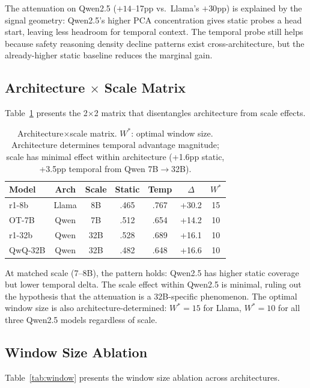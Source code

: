 \documentclass[11pt,a4paper]{article}
\begin{document}
The attenuation on Qwen2.5 ($+14$--17pp vs.\ Llama's $+30$pp) is explained by the signal geometry: Qwen2.5's higher PCA concentration gives static probes a head start, leaving less headroom for temporal context. The temporal probe still helps because safety reasoning density decline patterns exist cross-architecture, but the already-higher static baseline reduces the marginal gain.

\subsection{Architecture $\times$ Scale Matrix}
\label{sec:matrix}

Table~\ref{tab:matrix} presents the 2$\times$2 matrix that disentangles architecture from scale effects.

\begin{table}[t]
\centering
\small
\begin{tabular}{lcccccc}
\toprule
\textbf{Model} & \textbf{Arch} & \textbf{Scale} & \textbf{Static} & \textbf{Temp} & \textbf{$\Delta$} & \textbf{$W^*$} \\
\midrule
r1-8b & Llama & 8B & .465 & .767 & +30.2 & 15 \\
OT-7B & Qwen & 7B & .512 & .654 & +14.2 & 10 \\
r1-32b & Qwen & 32B & .528 & .689 & +16.1 & 10 \\
QwQ-32B & Qwen & 32B & .482 & .648 & +16.6 & 10 \\
\bottomrule
\end{tabular}
\caption{Architecture$\times$scale matrix. $W^*$: optimal window size. Architecture determines temporal advantage magnitude; scale has minimal effect within architecture (+1.6pp static, +3.5pp temporal from Qwen 7B$\to$32B).}
\label{tab:matrix}
\end{table}

At matched scale (7--8B), the pattern holds: Qwen2.5 has higher static coverage but lower temporal delta. The scale effect within Qwen2.5 is minimal, ruling out the hypothesis that the attenuation is a 32B-specific phenomenon. The optimal window size is also architecture-determined: $W^*{=}15$ for Llama, $W^*{=}10$ for all three Qwen2.5 models regardless of scale.

\subsection{Window Size Ablation}
\label{sec:window}

Table~\ref{tab:window} presents the window size ablation across architectures.
\end{document}
